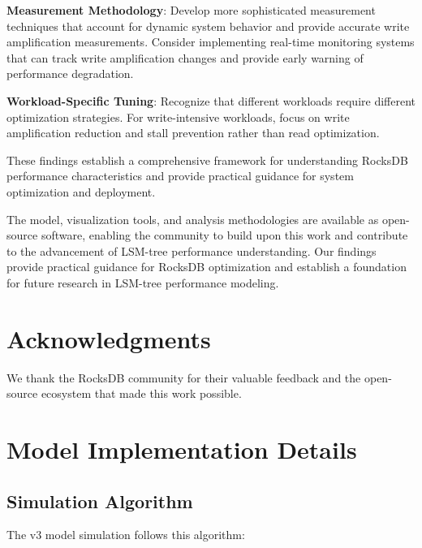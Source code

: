 \documentclass[11pt]{article}
\begin{document}
\textbf{Measurement Methodology}: Develop more sophisticated measurement techniques that account for dynamic system behavior and provide accurate write amplification measurements. Consider implementing real-time monitoring systems that can track write amplification changes and provide early warning of performance degradation.

\textbf{Workload-Specific Tuning}: Recognize that different workloads require different optimization strategies. For write-intensive workloads, focus on write amplification reduction and stall prevention rather than read optimization.

These findings establish a comprehensive framework for understanding RocksDB performance characteristics and provide practical guidance for system optimization and deployment.

The model, visualization tools, and analysis methodologies are available as open-source software, enabling the community to build upon this work and contribute to the advancement of LSM-tree performance understanding. Our findings provide practical guidance for RocksDB optimization and establish a foundation for future research in LSM-tree performance modeling.

\section*{Acknowledgments}

We thank the RocksDB community for their valuable feedback and the open-source ecosystem that made this work possible.


\appendix

\section{Model Implementation Details}




\subsection{Simulation Algorithm}

The v3 model simulation follows this algorithm:
\end{document}
